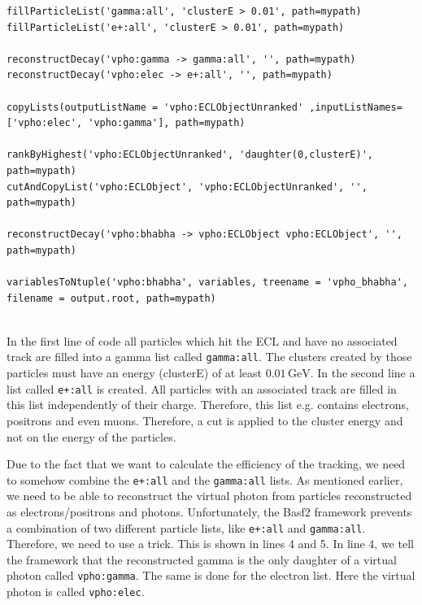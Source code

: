 \documentclass[a4paper,11pt,twosided,final,german,openbib,pdftex,listof=totoc,bibliography=totoc]{scrbook}
\begin{document}
{\small
\begin{lstlisting}
fillParticleList('gamma:all', 'clusterE > 0.01', path=mypath)
fillParticleList('e+:all', 'clusterE > 0.01', path=mypath)

reconstructDecay('vpho:gamma -> gamma:all', '', path=mypath)
reconstructDecay('vpho:elec -> e+:all', '', path=mypath)

copyLists(outputListName = 'vpho:ECLObjectUnranked' ,inputListNames=['vpho:elec', 'vpho:gamma'], path=mypath)

rankByHighest('vpho:ECLObjectUnranked', 'daughter(0,clusterE)', path=mypath)
cutAndCopyList('vpho:ECLObject', 'vpho:ECLObjectUnranked', '', path=mypath)
	
reconstructDecay('vpho:bhabha -> vpho:ECLObject vpho:ECLObject', '', path=mypath)

variablesToNtuple('vpho:bhabha', variables, treename = 'vpho_bhabha', filename = output.root, path=mypath)
	
\end{lstlisting}
}
\bigskip







In the first line of code all particles which hit the ECL and have no associated track are filled into a gamma list called \texttt{gamma:all}. The clusters created by those particles must have an energy (clusterE) of at least $0.01\,\textrm{GeV}$. In the second line a list called \texttt{e+:all} is created. All particles with an associated track are filled in this list independently of their charge. Therefore, this list e.g. contains electrons, positrons and even muons. Therefore, a cut is applied to the cluster energy and not on the energy of the particles.


Due to the fact that we want to calculate the efficiency of the tracking, we need to somehow combine the \texttt{e+:all} and the \texttt{gamma:all} lists. As mentioned earlier, we need to be able to reconstruct the virtual photon from particles reconstructed as electrons/positrons and photons.
Unfortunately, the Basf2 framework prevents a combination of two different particle lists, like \texttt{e+:all} and \texttt{gamma:all}. Therefore, we need to use a trick. This is shown in lines 4 and 5. In line 4, we tell the framework that the reconstructed gamma is the only daughter of a virtual photon called \texttt{vpho:gamma}. The same is done for the electron list. Here the virtual photon is called \texttt{vpho:elec}. 
\end{document}
